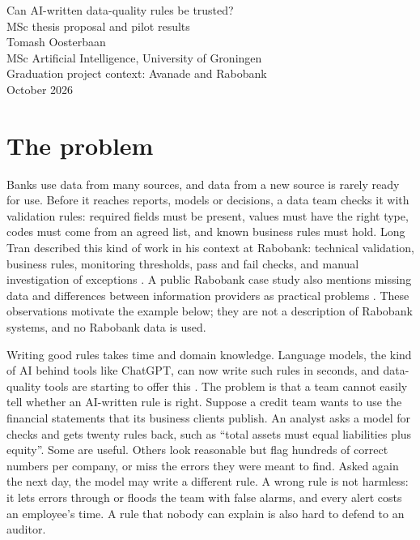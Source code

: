 \documentclass[11pt,a4paper]{article}
\begin{document}
\begin{center}
{\Large Can AI-written data-quality rules be trusted?}\\[0.4em]
{\large MSc thesis proposal and pilot results}\\[0.8em]
Tomash Oosterbaan\\
MSc Artificial Intelligence, University of Groningen\\
Graduation project context: Avanade and Rabobank\\
October 2026
\end{center}

\section{The problem}

Banks use data from many sources, and data from a new source is rarely ready for use. Before it reaches reports, models or decisions, a data team checks it with validation rules: required fields must be present, values must have the right type, codes must come from an agreed list, and known business rules must hold. Long Tran described this kind of work in his context at Rabobank: technical validation, business rules, monitoring thresholds, pass and fail checks, and manual investigation of exceptions \cite{tran}. A public Rabobank case study also mentions missing data and differences between information providers as practical problems \cite{alderse}. These observations motivate the example below; they are not a description of Rabobank systems, and no Rabobank data is used.

Writing good rules takes time and domain knowledge. Language models, the kind of AI behind tools like ChatGPT, can now write such rules in seconds, and data-quality tools are starting to offer this \cite{rehberger}. The problem is that a team cannot easily tell whether an AI-written rule is right. Suppose a credit team wants to use the financial statements that its business clients publish. An analyst asks a model for checks and gets twenty rules back, such as ``total assets must equal liabilities plus equity''. Some are useful. Others look reasonable but flag hundreds of correct numbers per company, or miss the errors they were meant to find. Asked again the next day, the model may write a different rule. A wrong rule is not harmless: it lets errors through or floods the team with false alarms, and every alert costs an employee's time. A rule that nobody can explain is also hard to defend to an auditor.
\end{document}
